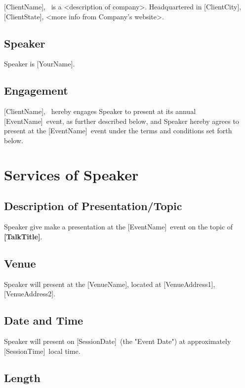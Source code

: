 \documentclass[a4paper,12pt]{article} %
\newcommand{\YourName}{[YourName]}
\newcommand{\TalkTitle}{[TalkTitle]}
\newcommand{\ClientName}{[ClientName]}
\newcommand{\ClientCity}{[ClientCity]}
\newcommand{\ClientState}{[ClientState]}
\newcommand{\EventName}{[EventName]}
\newcommand{\SessionDate}{[SessionDate]}
\newcommand{\SessionTime}{[SessionTime]}
\newcommand{\VenueName}{[VenueName]}
\newcommand{\VenueAddressLineOne}{[VenueAddress1]}
\newcommand{\VenueAddressAddressLineTwo}{[VenueAddress2]}
\begin{document}
\ClientName, ~is a <description of company>. Headquartered in \ClientCity, \ClientState, <more info from Company's website>.

\subsection{Speaker}

Speaker is \YourName.

\subsection{Engagement}

\ClientName, ~hereby engages Speaker to present at its annual \EventName ~event, as further described below, and Speaker hereby agrees to present at the \EventName ~event under the terms and conditions set forth below.


\section{Services of Speaker}

\subsection{Description of Presentation/Topic}

Speaker give make a presentation at the \EventName ~event on the topic of \textbf{\TalkTitle}.

\subsection{Venue}

Speaker will present at the \VenueName, located at \VenueAddressLineOne, \VenueAddressAddressLineTwo.

\subsection{Date and Time}

Speaker will present on \SessionDate ~(the "Event Date") at approximately \SessionTime ~local time.

\subsection{Length}
\end{document}
